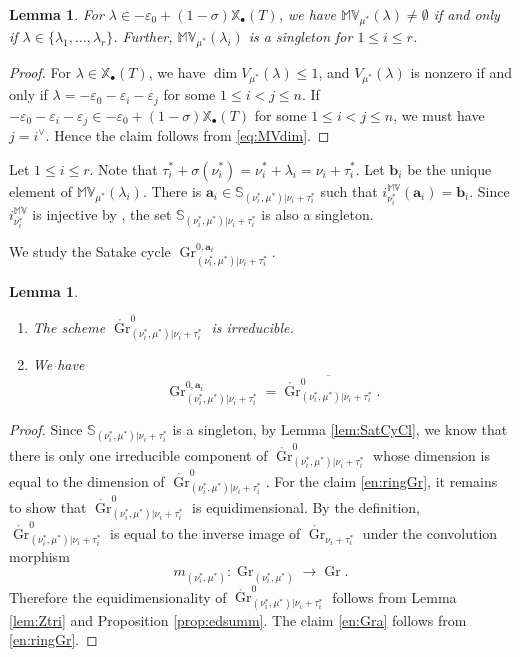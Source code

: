 \documentclass[12pt,a4paper]{article}
\newtheorem{lem}[thm]{Lemma}
\DeclareMathOperator{\Gr}{Gr}
\newcommand{\bX}{\mathbb{X}}
\newcommand{\bfa}{\mathbf{a}}
\newcommand{\bfb}{\mathbf{b}}
\newcommand{\ol}{\overline}
\newcommand{\bMV}{\mathbb{MV}}
\begin{document}
\begin{lem}\label{lem:MVnz}
For $\lambda \in -\varepsilon_0 + (1 - \sigma)\bX_{\bullet}(T)$, 
we have 
$\bMV_{\mu^*}(\lambda) \neq \emptyset$ if and only if 
$\lambda \in \{ \lambda_1, \ldots , \lambda_r \}$. 
Further, $\bMV_{\mu^*}(\lambda_i)$ is a singleton for $1 \leq i \leq r$. 
\end{lem}
\begin{proof}
For $\lambda \in \bX_{\bullet}(T)$, 
we have $\dim V_{\mu^*} (\lambda) \leq 1$, and 
$V_{\mu^*} (\lambda)$ is nonzero if and only if 
$\lambda=-\varepsilon_0 -\varepsilon_i - \varepsilon_j$ for some $1 \leq i < j \leq n$. 
If $-\varepsilon_0-\varepsilon_i - \varepsilon_j \in -\varepsilon_0 +(1 - \sigma)\bX_{\bullet}(T)$ 
for some $1 \leq i < j \leq n$, we must have $j=i^{\vee}$. 
Hence the claim follows from \eqref{eq:MVdim}. 
\end{proof}

Let $1 \leq i \leq r$. 
Note that $\tau_i^* +\sigma (\nu_i^*)= \nu_i^* +\lambda_i =\nu_i+\tau_i^*$. 
Let $\bfb_i$ be the unique element of 
$\bMV_{\mu^*}(\lambda_i)$. 
There is $\bfa_i \in  \mathbb{S}_{(\nu_i^*,\mu^*)|\nu_i+\tau_i^*}$ such that 
$i_{\nu_i^*}^{\mathbb{MV}} (\bfa_i)=\bfb_i$. 
Since $i_{\nu_i^*}^{\mathbb{MV}}$ is injective by \cite[Lemma 3.2.7]{XiZhCycSh}, the set $\mathbb{S}_{(\nu_i^*,\mu^*)|\nu_i+\tau_i^*}$ is also a singleton. 


We study the Satake cycle 
$\Gr^{0,\bfa_i}_{(\nu^*_i, \mu^*) | \nu_i+\tau_i^* }$. 
\begin{lem}\label{lem:Gracl}
\begin{enumerate}
\item\label{en:ringGr}
The scheme 
$\mathring{\Gr}^{0}_{(\nu^*_i, \mu^*) | \nu_i +\tau_i^* }$ 
is irreducible. 
\item\label{en:Gra} 
We have 
\[
 \Gr^{0,\bfa_i}_{(\nu^*_i, \mu^*) | \nu_i +\tau_i^*}=\ol{\mathring{\Gr}^{0}_{(\nu^*_i, \mu^*) | \nu_i +\tau_i^*}}. 
\]
\end{enumerate}
\end{lem}
\begin{proof}
Since $\mathbb{S}_{(\nu_i^*,\mu^*)|\nu_i+\tau_i^*}$ is a singleton, by Lemma \ref{lem:SatCyCl}, 
we know that there is only one irreducible component of $\mathring{\Gr}^{0}_{(\nu^*_i, \mu^*) | \nu_i +\tau_i^* }$ whose dimension is equal to the dimension of $\mathring{\Gr}^{0}_{(\nu^*_i, \mu^*) | \nu_i +\tau_i^* }$. For the claim \ref{en:ringGr}, 
it remains to show that $\mathring{\Gr}^{0}_{(\nu^*_i, \mu^*) | \nu_i +\tau_i^* }$ is equidimensional. 
By the definition, 
$\mathring{\Gr}^{0}_{(\nu^*_i, \mu^*) | \nu_i +\tau_i^* }$ is equal to the inverse image of $\mathring{\Gr}_{\nu_i +\tau_i^* }$ 
under the convolution morphism 
\[
 m_{(\nu^*_i, \mu^*)} \colon 
 \Gr_{(\nu^*_i, \mu^*)} \to \Gr. 
\]
Therefore the equidimensionality of $\mathring{\Gr}^{0}_{(\nu^*_i, \mu^*) | \nu_i +\tau_i^* }$ follows from 
Lemma \ref{lem:Ztri} and
Proposition \ref{prop:edsumm}.  
The claim \ref{en:Gra} follows from \ref{en:ringGr}. 
\end{proof}
\end{document}
